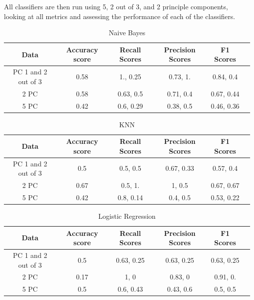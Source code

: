 \documentclass{article}
\begin{document}
All classifiers are then run using 5, 2 out of 3, and 2 principle components, looking at all metrics and assessing the performance of each of the classifiers. 

\clearpage
 
\begin{table}[!htb]
    \centering
    \begin{tabular}{c|c|c|c|c|c}
        \textbf{Data} & \textbf{Accuracy score} & \textbf{Recall Scores}& \textbf{Precision Scores}& \textbf{F1 Scores} \\
        \hline
        PC 1 and 2 out of 3 & 0.58 & 1., 0.25 & 0.73, 1. & 0.84, 0.4\\
        2 PC & 0.58 & 0.63, 0.5 & 0.71, 0.4 & 0.67, 0.44\\
        5 PC & 0.42 & 0.6, 0.29 & 0.38, 0.5 & 0.46, 0.36
    \end{tabular}
    \caption{Naive Bayes}
    \label{tab:Naive Bayes}
\end{table}


\begin{table}[!htb]
    \centering
    \begin{tabular}{c|c|c|c|c|c}
        \textbf{Data} & \textbf{Accuracy score} & \textbf{Recall Scores}& \textbf{Precision Scores}& \textbf{F1 Scores} \\
        \hline
        PC 1 and 2 out of 3 & 0.5 & 0.5, 0.5 & 0.67, 0.33 & 0.57, 0.4\\
        2 PC & 0.67 & 0.5, 1. & 1, 0.5 & 0.67, 0.67\\
        5 PC & 0.42 & 0.8, 0.14 & 0.4, 0.5 & 0.53, 0.22
    \end{tabular}
    \caption{KNN}
    \label{tab:KNN}
\end{table}

\begin{table}[!htb]
    \centering
    \begin{tabular}{c|c|c|c|c|c}
        \textbf{Data} & \textbf{Accuracy score} & \textbf{Recall Scores}& \textbf{Precision Scores}& \textbf{F1 Scores} \\
        \hline
        PC 1 and 2 out of 3 & 0.5 & 0.63, 0.25 & 0.63, 0.25 & 0.63, 0.25\\
        2 PC & 0.17 & 1, 0 & 0.83, 0 & 0.91, 0.\\
        5 PC & 0.5 & 0.6, 0.43 & 0.43, 0.6 & 0.5, 0.5
    \end{tabular}
    \caption{Logistic Regression}
    \label{tab:Logistic Regression}
\end{table}
\end{document}
